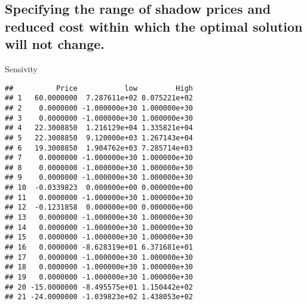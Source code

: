 \documentclass[
]{article}
\newenvironment{Shaded}{\begin{snugshade}}{\end{snugshade}}
\newcommand{\DecValTok}[1]{\textcolor[rgb]{0.00,0.00,0.81}{#1}}
\newcommand{\FunctionTok}[1]{\textcolor[rgb]{0.00,0.00,0.00}{#1}}
\newcommand{\NormalTok}[1]{#1}
\newcommand{\OtherTok}[1]{\textcolor[rgb]{0.56,0.35,0.01}{#1}}
\newcommand{\SpecialCharTok}[1]{\textcolor[rgb]{0.00,0.00,0.00}{#1}}
\newcommand{\StringTok}[1]{\textcolor[rgb]{0.31,0.60,0.02}{#1}}
\begin{document}
\begin{Shaded}
\end{Shaded}

\hypertarget{specifying-the-range-of-shadow-prices-and-reduced-cost-within-which-the-optimal-solution-will-not-change.}{%
\subsection{Specifying the range of shadow prices and reduced cost
within which the optimal solution will not
change.}\label{specifying-the-range-of-shadow-prices-and-reduced-cost-within-which-the-optimal-solution-will-not-change.}}

\begin{Shaded}
\begin{Highlighting}[]
\NormalTok{Sensivity}
\end{Highlighting}
\end{Shaded}

\begin{verbatim}
##          Price           low         High
## 1   60.0000000  7.287611e+02 8.075221e+02
## 2    0.0000000 -1.000000e+30 1.000000e+30
## 3    0.0000000 -1.000000e+30 1.000000e+30
## 4   22.3008850  1.216129e+04 1.335821e+04
## 5   22.3008850  9.120000e+03 1.267143e+04
## 6   19.3008850  1.904762e+03 7.285714e+03
## 7    0.0000000 -1.000000e+30 1.000000e+30
## 8    0.0000000 -1.000000e+30 1.000000e+30
## 9    0.0000000 -1.000000e+30 1.000000e+30
## 10  -0.0339823  0.000000e+00 0.000000e+00
## 11   0.0000000 -1.000000e+30 1.000000e+30
## 12  -0.1231858  0.000000e+00 0.000000e+00
## 13   0.0000000 -1.000000e+30 1.000000e+30
## 14   0.0000000 -1.000000e+30 1.000000e+30
## 15   0.0000000 -1.000000e+30 1.000000e+30
## 16   0.0000000 -8.628319e+01 6.371681e+01
## 17   0.0000000 -1.000000e+30 1.000000e+30
## 18   0.0000000 -1.000000e+30 1.000000e+30
## 19   0.0000000 -1.000000e+30 1.000000e+30
## 20 -15.0000000 -8.495575e+01 1.150442e+02
## 21 -24.0000000 -1.039823e+02 1.438053e+02
\end{verbatim}
\end{document}
